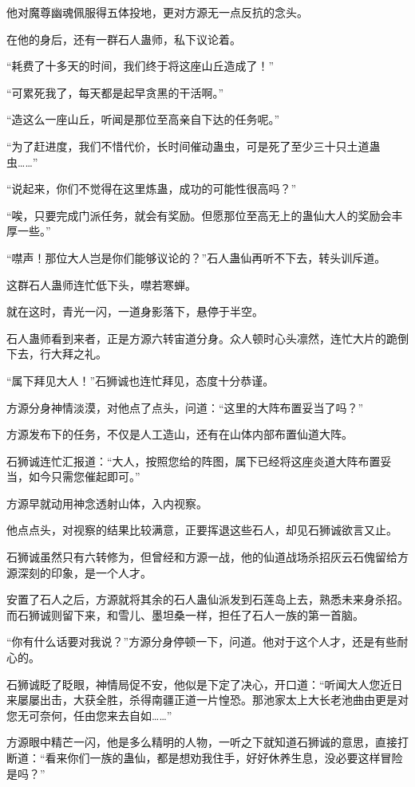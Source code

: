 \begin{this_body}
他对魔尊幽魂佩服得五体投地，更对方源无一点反抗的念头。

在他的身后，还有一群石人蛊师，私下议论着。

“耗费了十多天的时间，我们终于将这座山丘造成了！”

“可累死我了，每天都是起早贪黑的干活啊。”

“造这么一座山丘，听闻是那位至高亲自下达的任务呢。”

“为了赶进度，我们不惜代价，长时间催动蛊虫，可是死了至少三十只土道蛊虫……”

“说起来，你们不觉得在这里炼蛊，成功的可能性很高吗？”

“唉，只要完成门派任务，就会有奖励。但愿那位至高无上的蛊仙大人的奖励会丰厚一些。”

“噤声！那位大人岂是你们能够议论的？”石人蛊仙再听不下去，转头训斥道。

这群石人蛊师连忙低下头，噤若寒蝉。

就在这时，青光一闪，一道身影落下，悬停于半空。

石人蛊师看到来者，正是方源六转宙道分身。众人顿时心头凛然，连忙大片的跪倒下去，行大拜之礼。

“属下拜见大人！”石狮诚也连忙拜见，态度十分恭谨。

方源分身神情淡漠，对他点了点头，问道：“这里的大阵布置妥当了吗？”

方源发布下的任务，不仅是人工造山，还有在山体内部布置仙道大阵。

石狮诚连忙汇报道：“大人，按照您给的阵图，属下已经将这座炎道大阵布置妥当，如今只需您催起即可。”

方源早就动用神念透射山体，入内视察。

他点点头，对视察的结果比较满意，正要挥退这些石人，却见石狮诚欲言又止。

石狮诚虽然只有六转修为，但曾经和方源一战，他的仙道战场杀招灰云石傀留给方源深刻的印象，是一个人才。

安置了石人之后，方源就将其余的石人蛊仙派发到石莲岛上去，熟悉未来身杀招。而石狮诚则留下来，和雪儿、墨坦桑一样，担任了石人一族的第一首脑。

“你有什么话要对我说？”方源分身停顿一下，问道。他对于这个人才，还是有些耐心的。

石狮诚眨了眨眼，神情局促不安，他似是下定了决心，开口道：“听闻大人您近日来屡屡出击，大获全胜，杀得南疆正道一片惶恐。那池家太上大长老池曲由更是对您无可奈何，任由您来去自如……”

方源眼中精芒一闪，他是多么精明的人物，一听之下就知道石狮诚的意思，直接打断道：“看来你们一族的蛊仙，都是想劝我住手，好好休养生息，没必要这样冒险是吗？”


\end{this_body}
